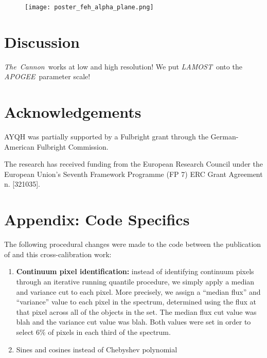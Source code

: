 \documentclass[12pt, preprint]{aastex}
\newcommand{\tc}{\textsl{The~Cannon}}
\newcommand{\apogee}{\textsl{APOGEE}}
\newcommand{\lamost}{\textsl{LAMOST}}
\begin{document}
\begin{figure}[!htbp]
\centering
\texttt{[image: poster\_feh\_alpha\_plane.png]}
\end{figure}

\section{Discussion}

\tc\ works at low and high resolution! We put \lamost\ onto the \apogee\ 
parameter scale!

\section{Acknowledgements}

AYQH was partially supported by a Fulbright grant through the German-American
Fulbright Commission.

The research has received funding from the European Research Council under the 
European Union's Seventh Framework Programme (FP 7) ERC Grant Agreement n.
[321035].

\appendix
{}

\section{Appendix: Code Specifics}
\label{sec:appendix}

The following procedural changes were made to the code between the publication
of \citep{ness2015} and this cross-calibration work:

\begin{enumerate}
  \item \textbf{Continuum pixel identification:} instead of identifying
    continuum pixels through an iterative running quantile procedure, we 
    simply apply a median and variance cut to each pixel. More precisely,
    we assign a ``median flux'' and ``variance'' value to each pixel in the 
    spectrum, determined using the flux at that pixel across all of the 
    objects in the set. The median flux cut value was blah and the variance 
    cut value was blah. Both values were set in order to select 6\% of pixels 
    in each third of the spectrum. 
  \item Sines and cosines instead of Chebyshev polynomial
\end{enumerate}
\end{document}
